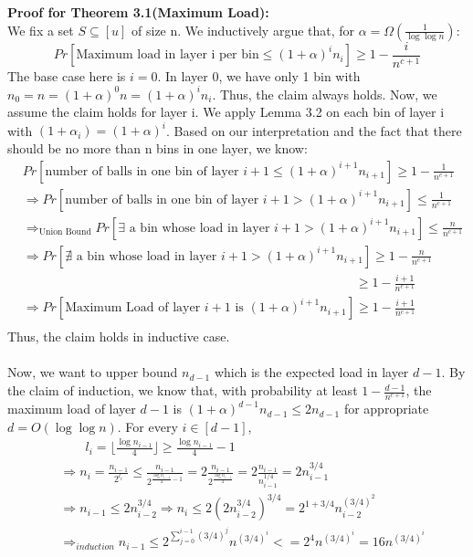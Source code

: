 \documentclass[a4paper, english]{paper}
\begin{document}
	\noindent\textbf{Proof for Theorem 3.1(Maximum Load):} \\
	We fix a set $S\subseteq[u]$ of size n. We inductively argue that, for $\alpha = \Omega(\frac1{\log\log n})$:
	$$Pr\left[\text{Maximum load in layer i per bin}\le(1+\alpha)^in_i\right]\ge1-\frac i{n^{c+1}}$$
	The base case here is $i = 0$. In layer 0, we have only 1 bin with $n_0=n=(1+\alpha)^0n = (1+\alpha)^in_i$. Thus, the claim always holds. Now, we assume the claim holds for layer i. We apply Lemma 3.2 on each bin of layer i with $(1+\alpha_i) = (1+\alpha)^i$. Based on our interpretation and the fact that there should be no more than n bins in one layer, we know:
\begin{align*}
&Pr\left[ \text{number of balls in one bin of layer }i+1\le (1+\alpha)^{i+1}n_{i+1}\right] \ge 1-\frac1{n^{c+1}}\\ 
&\Rightarrow Pr\left[ \text{number of balls in one bin of layer }i+1> (1+\alpha)^{i+1}n_{i+1}\right] \le \frac1{n^{c+1}}\\
&\Rightarrow_{\text{Union Bound}} Pr\left[ \exists \text{ a bin whose load in layer }i+1> (1+\alpha)^{i+1}n_{i+1}\right] \le \frac n{n^{c+1}}\\
&\Rightarrow Pr\left[ \nexists \text{ a bin whose load in layer }i+1> (1+\alpha)^{i+1}n_{i+1}\right] \ge 1-\frac n{n^{c+1}}\\
&\qquad\qquad\qquad\qquad\qquad\qquad\qquad\qquad\qquad\qquad\qquad\qquad\qquad\ge 1-\frac {i+1}{n^{c+1}}\\
&\Rightarrow Pr\left[ \text{Maximum Load of layer }i+1 \text{ is } (1+\alpha)^{i+1}n_{i+1}\right] \ge 1-\frac {i+1}{n^{c+1}}\\
\end{align*}
Thus, the claim holds in inductive case.\\\\
Now, we want to upper bound $n_{d-1}$ which is the expected load in layer $d-1$. By the claim of induction, we know that, with probability at least $1-\frac{d-1}{n^{c+1}}$, the maximum load of layer $d-1$ is $(1+\alpha)^{d-1}n_{d-1}\le2n_{d-1}$ for appropriate $d=O(\log\log n)$. For every $i\in[d-1]$, 
\begin{align*}
&\qquad l_i =\lfloor\frac{\log n_{i-1}}4\rfloor \ge \frac{\log n_{i-1}}4 -1\\
&\Rightarrow n_i = \frac{n_{i-1}}{2^{l_i}}\le \frac{n_{i-1}}{2^{\frac{\log n_{i-1}}4 -1}} = 2\frac{n_{i-1}}{2^{\frac{\log n_{i-1}}4}}=2\frac{n_{i-1}}{n_{i-1}^{1/4}}= 2 n_{i-1}^{3/4}\\
&\Rightarrow n_{i-1}\le 2 n_{i-2}^{3/4}\Rightarrow n_i\le 2 (2 n_{i-2}^{3/4})^{3/4}=2^{1+3/4}n_{i-2}^{(3/4)^2}\\
&\Rightarrow_{induction} n_{i-1}\le 2^{\sum_{j=0}^{i-1}(3/4)^j}n^{(3/4)^i}<=2^4n^{(3/4)^i}=16n^{(3/4)^i}
\end{align*}
\end{document}
